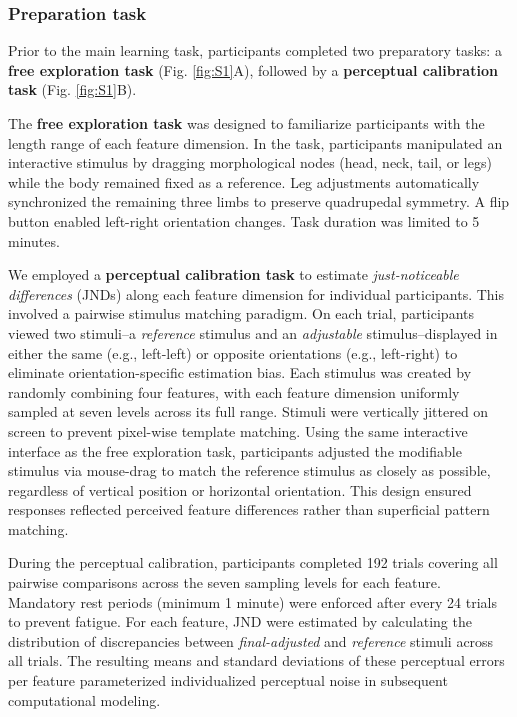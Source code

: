 \subsubsection{Preparation task}
Prior to the main learning task, participants completed two preparatory tasks: a \textbf{free exploration task} (Fig. \ref{fig:S1}A), followed by a \textbf{perceptual calibration task} (Fig. \ref{fig:S1}B). 

The \textbf{free exploration task} was designed to familiarize participants with the length range of each feature dimension. In the task, participants manipulated an interactive stimulus by dragging morphological nodes (head, neck, tail, or legs) while the body remained fixed as a reference. Leg adjustments automatically synchronized the remaining three limbs to preserve quadrupedal symmetry. A flip button enabled left-right orientation changes. Task duration was limited to 5 minutes.

We employed a \textbf{perceptual calibration task} to estimate \textit{just-noticeable differences} (JNDs) along each feature dimension for individual participants. This involved a pairwise stimulus matching paradigm. On each trial, participants viewed two stimuli--a \textit{reference} stimulus and an \textit{adjustable} stimulus--displayed in either the same (e.g., left-left) or opposite orientations (e.g., left-right) to eliminate orientation-specific estimation bias. Each stimulus was created by randomly combining four features, with each feature dimension uniformly sampled at seven levels across its full range. Stimuli were vertically jittered on screen to prevent pixel-wise template matching. Using the same interactive interface as the free exploration task, participants adjusted the modifiable stimulus via mouse-drag to match the reference stimulus as closely as possible, regardless of vertical position or horizontal orientation. This design ensured responses reflected perceived feature differences rather than superficial pattern matching.

During the perceptual calibration, participants completed 192 trials covering all pairwise comparisons across the seven sampling levels for each feature. Mandatory rest periods (minimum 1 minute) were enforced after every 24 trials to prevent fatigue. For each feature, JND were estimated by calculating the distribution of discrepancies between \textit{final-adjusted} and \textit{reference} stimuli across all trials. The resulting means and standard deviations of these perceptual errors per feature parameterized individualized perceptual noise in subsequent computational modeling.

